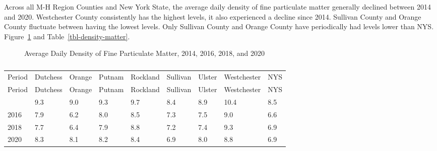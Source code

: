 \documentclass[
  english,
  letterpaper,
]{report}
\begin{document}
Across all M-H Region Counties and New York State, the average daily
density of fine particulate matter generally declined between 2014 and
2020. Westchester County consistently has the highest levels, it also
experienced a decline since 2014. Sullivan County and Orange County
fluctuate between having the lowest levels. Only Sullivan County and
Orange County have periodically had levels lower than NYS.
Figure~\ref{fig-density-matter} and Table~\ref{tbl-density-matter}.

\begin{figure}


\caption{\label{fig-density-matter}Average Daily Density of Fine
Particulate Matter, 2014, 2016, 2018, and 2020}

\end{figure}%

\begin{longtable}[]{@{}lllllllll@{}}

\caption{\label{tbl-density-matter}Average Daily Density of Fine
Particulate Matter, 2014, 2016, 2018, and 2020}

\tabularnewline

\caption{}\label{T_96a63}\tabularnewline
\toprule\noalign{}
Period & Dutchess & Orange & Putnam & Rockland & Sullivan & Ulster &
Westchester & NYS \\
\midrule\noalign{}
\endfirsthead
\toprule\noalign{}
Period & Dutchess & Orange & Putnam & Rockland & Sullivan & Ulster &
Westchester & NYS \\
\midrule\noalign{}
\endhead
\bottomrule\noalign{}
\endlastfoot
2014 & 9.3 & 9.0 & 9.3 & 9.7 & 8.4 & 8.9 & 10.4 & 8.5 \\
2016 & 7.9 & 6.2 & 8.0 & 8.5 & 7.3 & 7.5 & 9.0 & 6.6 \\
2018 & 7.7 & 6.4 & 7.9 & 8.8 & 7.2 & 7.4 & 9.3 & 6.9 \\
2020 & 8.3 & 8.1 & 8.2 & 8.4 & 6.9 & 8.0 & 8.8 & 6.9 \\

\end{longtable}
\end{document}
